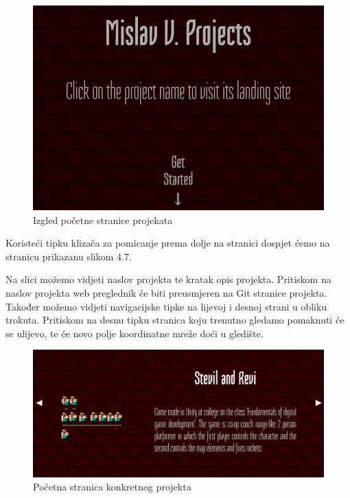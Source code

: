 \documentclass[times, utf8, zavrsni, numeric]{fer}
\begin{document}
\begin{figure}[htb]
				\centering
				\includegraphics[width=14.6cm]{images/projects-main.png}
				\caption{Izgled početne stranice projekata}
				\label{fig:projects-main}
\end{figure}

Koristeći tipku klizača za pomicanje prema dolje na stranici dospjet ćemo na stranicu prikazanu slikom 4.7.

\pagebreak
Na slici možemo vidjeti naslov projekta te kratak opis projekta.
Pritiskom na naslov projekta web preglednik će biti preusmjeren na Git stranice projekta.
Također možemo vidjeti navigacijske tipke na lijevoj i desnoj strani u obliku trokuta.
Pritiskom na desnu tipku stranica koju trenutno gledamo pomaknuti će se ulijevo, te će novo polje koordinatne mreže doći u gledište.

\begin{figure}[htb]
				\centering
				\includegraphics[width=14.6cm]{images/projects-img-text.png}
				\caption{Početna stranica konkretnog projekta}
				\label{fig:projects-img-text}
\end{figure}
\end{document}
